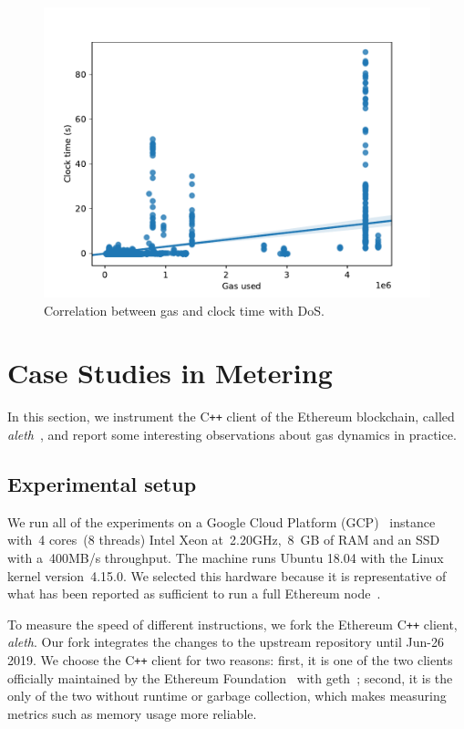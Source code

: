 \begin{figure}[tb]
  \centering\includegraphics[width=\textwidth]{3-vm-security/figures/cpu-gas-extcodesize.pdf}
  \caption{Correlation between gas and clock time with DoS.}
  \label{fig:extcodesize-cpu}
\end{figure}

\section{Case Studies in Metering}
\label{sec:3:case-studies}

In this section, we instrument the C\texttt{++} client of the Ethereum blockchain, called \textit{aleth}~\cite{aleth}, and report some interesting observations about gas dynamics in practice.

\subsection{Experimental setup}
 We run all of the experiments on a Google Cloud Platform (GCP)~\cite{gcp-compute-engine} instance with~4 cores~(8 threads) Intel Xeon at~2.20GHz,~8~GB of RAM and an SSD with a~400MB/s throughput.
The machine runs Ubuntu 18.04 with the Linux kernel version~4.15.0. We selected this hardware because it is representative of what has been reported as sufficient to run a full Ethereum node~\cite{node-incentive,pantheon-system-requirements,eth-hardware-requirements}.

 To measure the speed of different instructions, we fork the Ethereum C\texttt{++} client, \textit{aleth}.
Our fork integrates the changes to the upstream repository until Jun-26 2019.
We choose the C\texttt{++} client for two reasons: first, it is one of the two clients officially maintained by the Ethereum Foundation~\cite{ethereum-foundation-github} with geth~\cite{geth}; second, it is the only of the two without runtime or garbage collection, which makes measuring metrics such as memory usage more reliable.

